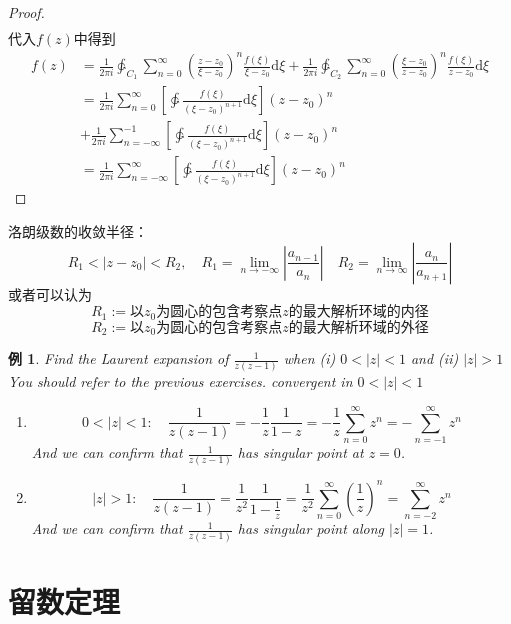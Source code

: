 \documentclass[10pt, a4paper, oneside]{ctexbook}
\newtheorem{example}[theorem]{例}
\def\D{\mathrm{d}}
\newcommand{\F}[1][z]
{\ensuremath{f(#1)}}
\begin{document}
\begin{proof}
\begin{align*}
    \end{align*}
    代入$\F$中得到
    \begin{align*}
        \F&=\frac{1}{2\pi i} \ointctrclockwise_{C_1} \sum_{n=0}^\infty  \left(\frac{z-z_0}{\xi-z_0}\right)^n  \frac{\F[\xi]}{\xi-z_0} \D \xi 
        + \frac{1}{2\pi i} \ointctrclockwise_{C_2} \sum_{n=0}^\infty \left(\frac{\xi-z_0}{z-z_0}\right)^n  \frac{\F[\xi]}{z-z_0} \D \xi\\
        &= \frac{1}{2\pi i}  \sum_{n=0}^\infty \left[\ointctrclockwise \frac{\F[\xi]}{(\xi-z_0)^{n+1}}\D \xi \right](z-z_0)^n \\
        & +\frac{1}{2\pi i}  \sum_{n=-\infty}^{-1} \left[\ointctrclockwise \frac{\F[\xi]}{(\xi-z_0)^{n+1}}\D \xi\right](z-z_0)^n  \\
        &= \frac{1}{2\pi i}  \sum_{n=-\infty}^\infty \left[\ointctrclockwise \frac{\F[\xi]}{(\xi-z_0)^{n+1}}\D \xi \right](z-z_0)^n
    \end{align*}
\end{proof}
洛朗级数的收敛半径：
$$
R_1<|z-z_0|<R_2,\quad R_1=\lim_{n\to -\infty} \left| \frac{a_{n-1}}{a_n} \right|\quad R_2=\lim_{n \to \infty} \left| \frac{a_n}{a_{n+1}} \right|
$$
或者可以认为
$$R_1 := \text{以$z_0$为圆心的包含考察点$z$的最大解析环域的内径}$$
$$R_2 := \text{以$z_0$为圆心的包含考察点$z$的最大解析环域的外径}$$
\begin{example}
    Find the Laurent expansion of $\frac{1}{z(z-1)}$ when (i) $0<|z|<1$ and (ii) $|z|>1$ You should refer to the previous exercises. convergent in $0<|z|<1$
    \begin{enumerate}
        \item $$0<|z|<1: \quad \frac{1}{z(z-1)}=-\frac{1}{z} \frac{1}{1-z}=-\frac{1}{z} \sum_{n=0}^{\infty} z^{n}=-\sum_{n=-1}^{\infty} z^{n}$$ And we can confirm that $\frac{1}{z(z-1)}$ has singular point at $z=0$.
        \item $$|z|>1:\quad \frac{1}{z(z-1)}=\frac{1}{z^{2}} \frac{1}{1-\frac{1}{z}}=\frac{1}{z^{2}} \sum_{n=0}^{\infty}\left(\frac{1}{z}\right)^{n}=\sum_{n=-2}^{\infty} z^{n}$$ And we can confirm that $\frac{1}{z(z-1)}$ has singular point along $|z|=1$.
    \end{enumerate}
\end{example}
\chapter{留数定理}
\end{document}
